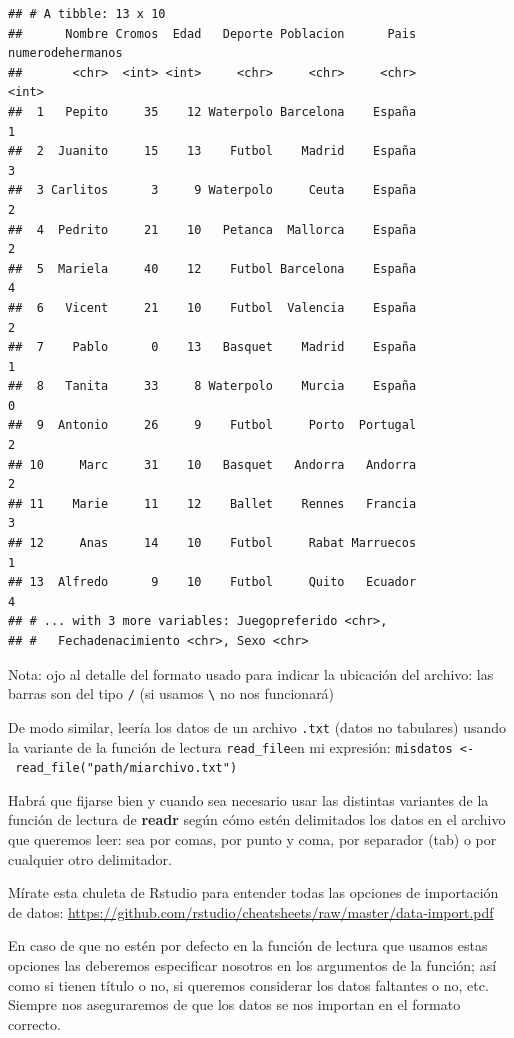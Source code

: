\documentclass[]{book}
\theoremstyle{definition}
\theoremstyle{definition}
\theoremstyle{remark}
\begin{document}
\begin{verbatim}
## # A tibble: 13 x 10
##      Nombre Cromos  Edad   Deporte Poblacion      Pais numerodehermanos
##       <chr>  <int> <int>     <chr>     <chr>     <chr>            <int>
##  1   Pepito     35    12 Waterpolo Barcelona    España                1
##  2  Juanito     15    13    Futbol    Madrid    España                3
##  3 Carlitos      3     9 Waterpolo     Ceuta    España                2
##  4  Pedrito     21    10   Petanca  Mallorca    España                2
##  5  Mariela     40    12    Futbol Barcelona    España                4
##  6   Vicent     21    10    Futbol  Valencia    España                2
##  7    Pablo      0    13   Basquet    Madrid    España                1
##  8   Tanita     33     8 Waterpolo    Murcia    España                0
##  9  Antonio     26     9    Futbol     Porto  Portugal                2
## 10     Marc     31    10   Basquet   Andorra   Andorra                2
## 11    Marie     11    12    Ballet    Rennes   Francia                3
## 12     Anas     14    10    Futbol     Rabat Marruecos                1
## 13  Alfredo      9    10    Futbol     Quito   Ecuador                4
## # ... with 3 more variables: Juegopreferido <chr>,
## #   Fechadenacimiento <chr>, Sexo <chr>
\end{verbatim}

Nota: ojo al detalle del formato usado para indicar la ubicación del
archivo: las barras son del tipo \texttt{/} (si usamos
\texttt{\textbackslash{}} no nos funcionará)

De modo similar, leería los datos de un archivo \texttt{.txt} (datos no
tabulares) usando la variante de la función de lectura
\texttt{read\_file}en mi expresión:
\texttt{misdatos\ \textless{}-\ read\_file("path/miarchivo.txt")}

Habrá que fijarse bien y cuando sea necesario usar las distintas
variantes de la función de lectura de \textbf{readr} según cómo estén
delimitados los datos en el archivo que queremos leer: sea por comas,
por punto y coma, por separador (tab) o por cualquier otro delimitador.

Mírate esta chuleta de Rstudio para entender todas las opciones de
importación de datos:
\url{https://github.com/rstudio/cheatsheets/raw/master/data-import.pdf}

En caso de que no estén por defecto en la función de lectura que usamos
estas opciones las deberemos especificar nosotros en los argumentos de
la función; así como si tienen título o no, si queremos considerar los
datos faltantes o no, etc. Siempre nos aseguraremos de que los datos se
nos importan en el formato correcto.
\end{document}

